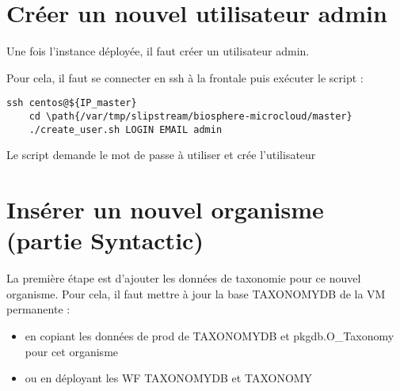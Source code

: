 \section{Créer un nouvel utilisateur admin}

Une fois l'instance déployée, il faut créer un utilisateur admin.

Pour cela, il faut se connecter en ssh à la frontale puis exécuter le script :
\begin{lstlisting}[style=Bash]
    ssh centos@${IP_master}
    cd \path{/var/tmp/slipstream/biosphere-microcloud/master}
    ./create_user.sh LOGIN EMAIL admin
\end{lstlisting}
Le script demande le mot de passe à utiliser et crée l'utilisateur

\section{Insérer un nouvel organisme (partie Syntactic)}

La première étape est d'ajouter les données de taxonomie pour ce nouvel organisme.
Pour cela, il faut mettre à jour la base TAXONOMYDB de la VM permanente :
\begin{itemize}
    \item en copiant les données de prod de TAXONOMYDB et pkgdb.O\_Taxonomy pour cet organisme
    \item ou en déployant les WF TAXONOMYDB et TAXONOMY
\end{itemize}
\bigskip

